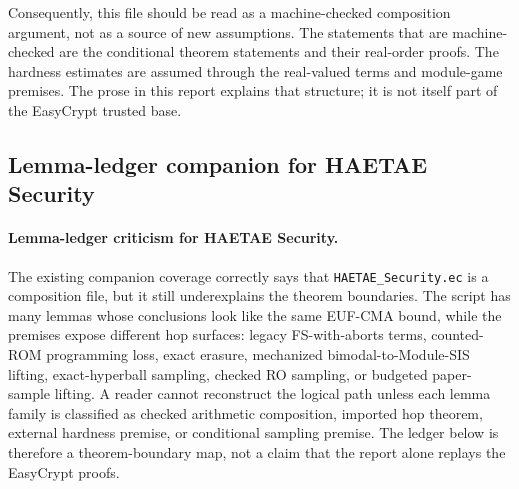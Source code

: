 \documentclass[11pt]{report}
\DeclareRobustCommand{\file}[1]{\ifmmode\text{\nolinkurl{#1}}\else\nolinkurl{#1}\fi}
\theoremstyle{definition}
\theoremstyle{plain}
\begin{document}
Consequently, this file should be read as a machine-checked composition
argument, not as a source of new assumptions.  The statements that are
machine-checked are the conditional theorem statements and their real-order
proofs.  The hardness estimates are assumed through the real-valued terms and
module-game premises.  The prose in this report explains that structure; it is
not itself part of the EasyCrypt trusted base.

\subsection{Lemma-ledger companion for HAETAE Security}

\paragraph{Lemma-ledger criticism for HAETAE Security.}
The existing companion coverage correctly says that
\file{HAETAE\_Security.ec} is a composition file, but it still underexplains
the theorem boundaries.  The script has many lemmas whose conclusions look like
the same EUF-CMA bound, while the premises expose different hop surfaces:
legacy FS-with-aborts terms, counted-ROM programming loss, exact erasure,
mechanized bimodal-to-Module-SIS lifting, exact-hyperball sampling, checked RO
sampling, or budgeted paper-sample lifting.  A reader cannot reconstruct the
logical path unless each lemma family is classified as checked arithmetic
composition, imported hop theorem, external hardness premise, or conditional
sampling premise.  The ledger below is therefore a theorem-boundary map, not a
claim that the report alone replays the EasyCrypt proofs.
\end{document}
